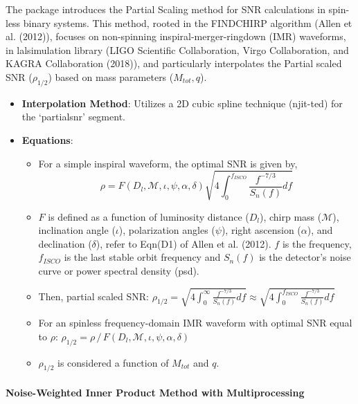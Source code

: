 \documentclass[10pt,a4paper,onecolumn]{article}
\let\textttOrig=\texttt
\def\texttt#1{\expandafter\textttOrig{\seqsplit{#1}}}
\let\oldparagraph\paragraph
\renewcommand{\paragraph}[1]{\oldparagraph{#1}\mbox{}}
\begin{document}
The \emph{\texttt{gwsnr}} package introduces the Partial Scaling method
for SNR calculations in spin-less binary systems. This method, rooted in
the FINDCHIRP algorithm (Allen et al. (2012)), focuses on non-spinning
inspiral-merger-ringdown (IMR) waveforms, in lalsimulation library (LIGO
Scientific Collaboration, Virgo Collaboration, and KAGRA Collaboration
(2018)), and particularly interpolates the Partial scaled SNR
(\(\rho_{1/2}\)) based on mass parameters (\(M_{tot},q\)).

\begin{itemize}
\item
  \textbf{Interpolation Method}: Utilizes a 2D cubic spline technique
  (njit-ted) for the `partialsnr' segment.
\item
  \textbf{Equations}:

  \begin{itemize}
  \item
    For a simple inspiral waveform, the optimal SNR is given by,
    \[\rho = F(D_l,\mathcal{M},\iota,\psi,\alpha, \delta) \sqrt{ 4\int_0^{f_{ISCO}} \frac{f^{-7/3}}{S_n(f)}df }\]
  \item
    \(F\) is defined as a function of luminosity distance (\(D_l\)),
    chirp mass (\(\mathcal{M}\)), inclination angle (\(\iota\)),
    polarization angles (\(\psi\)), right ascension (\(\alpha\)), and
    declination (\(\delta\)), refer to Eqn(D1) of Allen et al. (2012).
    \(f\) is the frequency, \(f_{ISCO}\) is the last stable orbit
    frequency and \(S_n(f)\) is the detector's noise curve or power
    spectral density (psd).
  \item
    Then, partial scaled SNR:
    \(\rho_{1/2} = \sqrt{ 4\int_0^\infty \frac{f^{-7/3}}{S_n(f)}df } \approx \sqrt{ 4\int_0^{f_{ISCO}} \frac{f^{-7/3}}{S_n(f)}df }\)
  \item
    For an spinless frequency-domain IMR waveform with optimal SNR equal
    to \(\rho\):
    \(\rho_{1/2} = \rho\,/\, F(D_l,\mathcal{M},\iota,\psi,\alpha, \delta)\)
  \item
    \(\rho_{1/2}\) is considered a function of \(M_{tot}\) and \(q\).
  \end{itemize}
\end{itemize}

\paragraph{Noise-Weighted Inner Product Method with
Multiprocessing}\label{noise-weighted-inner-product-method-with-multiprocessing}
\end{document}
